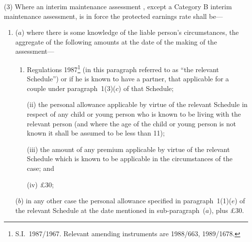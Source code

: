 \documentclass[12pt,a4paper]{article}
\begin{document}
(3) Where an interim maintenance assessment%
, except a Category B interim maintenance assessment,  %
is in force the protected earnings rate shall be—
\begin{enumerate}\item[]
($a$) where there is some knowledge of the liable person’s circumstances, the aggregate of the following amounts at the date of the making of the assessment—
\begin{enumerate}\item[]
 Regulations 1987\footnote{\frenchspacing S.I.~1987/1967. Relevant amending instruments are 1988/663, 1989/1678.} (in this paragraph referred to as “the relevant Schedule”) or if he is known to have a partner, that applicable for a couple under paragraph~1(3)($c$) of that Schedule;

(ii) the personal allowance applicable by virtue of the relevant Schedule in respect of any child or young person who is known to be living with the relevant person (and where the age of the child or young person is not known it shall be assumed to be less than 11);

(iii) the amount of any premium applicable by virtue of the relevant Schedule which is known to be applicable in the circumstances of the case; and

(iv) £30;
\end{enumerate}

\begin{sloppypar}
($b$) in any other case the personal allowance specified in paragraph~1(1)($e$) of the relevant Schedule at the date mentioned in sub-\hspace{0pt}paragraph~($a$), plus £30.
\end{sloppypar}
\end{enumerate}
\end{document}
